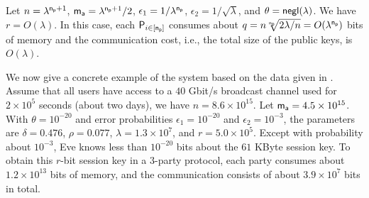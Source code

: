 %

 Let $n=\lambda^{\mathsf{n_p}+1}$, $\mathsf{m_a}=\lambda^{\mathsf{n_p}+1}/2$, $\epsilon_1=1/\lambda^{\mathsf{n_p}}$, $\epsilon_2=1/\sqrt{\lambda}$, and $\theta = \mathsf{negl}(\lambda)$. We have $r=O(\lambda)$. In this case, each $\mathsf{P}_{i\in[\mathsf{n_p}]}$ consumes about
$q=n\sqrt[\mathsf{n_p}]{2\lambda/n}=O(\lambda^{\mathsf{n_p}})$
bits of memory and the communication cost, i.e., the total size of the public keys, is $O(\lambda)$.

We now give a concrete example of the system based on the data given in \cite{C:CacMau97}.
Assume that all users have access to a $40$ Gbit/s broadcast channel used for $2\times 10^5$ seconds (about two days), we have $n = 8.6 \times 10^{15}$. Let $\mathsf{m_a}=4.5 \times 10^{15}$. With $\theta = 10^{-20}$ and error probabilities $\epsilon_1=10^{-20}$ and $\epsilon_2=10^{-3}$, the parameters are $\delta = 0.476$, $\rho = 0.077$, $\lambda = 1.3 \times 10^7$, and $r = 5.0 \times 10^5$. Except with probability about $10^{-3}$, Eve knows less than $10^{-20}$ bits about the $61$ KByte session key.
To obtain this $r$-bit session key in a $3$-party protocol, each party consumes about $1.2\times 10^{13}$ bits of memory, and the communication consists of about $3.9\times 10^7$ bits in total. %

